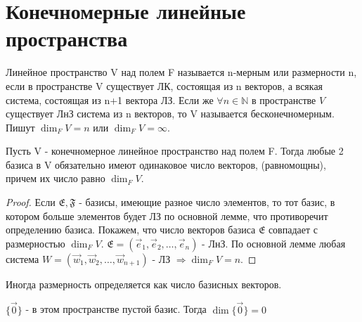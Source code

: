 \section{Конечномерные линейные пространства}
\begin{definition}
	Линейное пространство V над полем F называется n-мерным или размерности n, если в пространстве V существует ЛК, 
	состоящая из n векторов, а всякая система, состоящая из n+1 вектора ЛЗ. 
	Если же \(\forall n\in\mathbb{N}\text{ в пространстве } V \) существует ЛнЗ система из n векторов, то V называется бесконечномерным. 
	Пишут \(\dim_FV = n\) или \(\dim_FV = \infty\).
\end{definition}
\begin{theorem}
	Пусть V - конечномерное линейное пространство над полем F. 
	Тогда любые 2 базиса в V обязательно имеют одинаковое число векторов,
	(равномощны), причем их число равно \(\dim_FV\).
\end{theorem}
\begin{proof}
	Если \(\mathfrak{E}, \mathfrak{F}\) - базисы, имеющие разное число элементов, то тот базис, в котором больше элементов будет ЛЗ по основной лемме, что противоречит определению базиса. \newline
	Покажем, что число векторов базиса \(\mathfrak{E}\) совпадает с размерностью \(\dim_FV\).
	 \(\mathfrak{E} = (\vec e_1, \vec e_2, \ldots, \vec e_n)\) - ЛнЗ. 
	По основной лемме любая система \(W = (\vec w_1, \vec w_2, \ldots, \vec w_{n+1})\) - ЛЗ $\Longrightarrow \dim_FV = n$.
\end{proof}
\begin{note}
	Иногда размерность определяется как число базисных векторов.
\end{note}
\begin{note}
	\(\{\vec 0\}\) - в этом пространстве пустой базис. Тогда \(\dim\{\vec 0\} = 0\)
\end{note}
